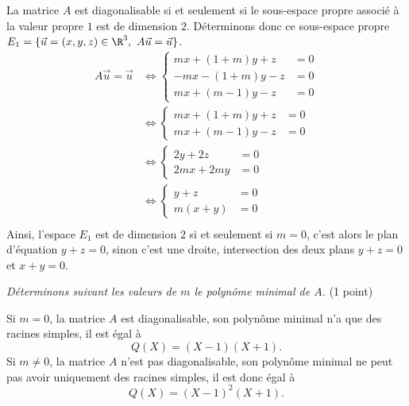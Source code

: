 {\begin{enumerate}
{La matrice $A$ est diagonalisable si et seulement si le sous-espace propre associ\'e \`a la valeur propre $1$ est de dimension $2$. D\'eterminons donc ce sous-espace propre $E_1=\{\vec u=(x,y,z)\in\R^3,\ A\vec u=\vec u\}$.
$$\begin{align*}
A\vec u=\vec u
&\iff\left\{{\begin{align*}mx+(1+m)y+z&=0 \\  -mx-(1+m)y-z&=0 \\  mx+(m-1)y-z&=0\end{align*}} \right. \\ 
&\iff\left\{{\begin{align*}mx+(1+m)y+z&=0 \\  mx+(m-1)y-z&=0\end{align*}}\right. \\ 
&\iff\left\{{\begin{align*}2y+2z&=0 \\  2mx+2my&=0\end{align*}}\right. \\ 
&\iff\left\{{\begin{align*}y+z&=0 \\  m(x+y)&=0\end{align*}}\right. \\ 
\end{align*}$$
Ainsi, l'espace $E_1$ est de dimension $2$ si et seulement si $m=0$, c'est alors le plan d'\'equation $y+z=0$, sinon c'est une droite, intersection des deux plans $y+z=0$ et $x+y=0$.

{\it D\'eterminons suivant les valeurs de $m$ le polyn\^ome minimal de $A$.} (1 point)

Si $m=0$, la matrice $A$ est diagonalisable, son polyn\^ome minimal n'a que des racines simples, il est \'egal \`a 
$$Q(X)=(X-1)(X+1).$$
Si $m\neq 0$, la matrice $A$ n'est pas diagonalisable, son polyn\^ome minimal ne peut pas avoir uniquement des racines simples, il est donc \'egal \`a
$$Q(X)=(X-1)^2(X+1).$$}
\end{enumerate}
}
